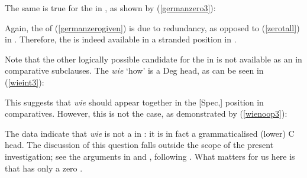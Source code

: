 The same is true for the  in , as shown by (\ref{germanzero3}):

\ea \label{germanzero3}
\z
\z

Again, the  of (\ref{germanzerogiven}) is due to redundancy, as opposed to (\ref{zerotall}) in . Therefore, the  is indeed available in a stranded position in .

Note that the other logically possible candidate for the  in  is not available as an  in comparative subclauses. The  \textit{wie} `how' is a Deg head, as can be seen in (\ref{wieint3}):

\ea \label{wieint3}
\z
\z

This suggests that \textit{wie} should appear together in the [Spec,] position in comparatives. However, this is not the case, as demonstrated by (\ref{wienoop3}):

\ea \label{wienoop3}
\z
\z

The data indicate that \textit{wie} is not a  in : it is in fact a grammaticalised (lower) C head. The discussion of this question falls outside the scope of the present investigation; see the arguments in \citet{bacskaiatkari2014dia} and \citet[223--226]{bacskaiatkari2014diss}, following \citet{jaeger2010}. What matters for us here is that  has only a zero   .

